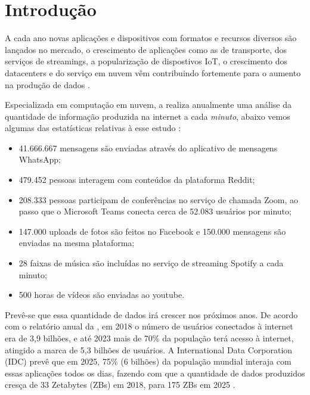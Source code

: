 \chapter{Introdução}
\label{chp:introduction}



A cada ano novas aplicações e dispositivos com formatos e recursos diversos são lançados no mercado, o crescimento de aplicações como as de transporte, dos serviços de streamings, a popularização de  dispostivos IoT, o crescimento dos datacenters e do serviço em nuvem vêm contribuindo fortemente para o aumento na produção de dados \citep{relatorio-idc}.

Especializada em computação em nuvem, a \citeauthor{domo-study} realiza anualmente uma análise da quantidade de informação produzida na internet 
a cada \textit{minuto}, abaixo vemos algumas das estatísticas relativas à esse estudo \citet{domo-study}:
\begin{itemize}
    \item 41.666.667 mensagens são enviadas através do aplicativo de mensagens WhatsApp;
    \item 479.452 pessoas interagem com conteúdos da plataforma Reddit;
    \item 208.333 pessoas participam de conferências no serviço de chamada Zoom, ao passo que o Microsoft Teams conecta cerca de 52.083 usuários por minuto;
    \item 147.000 uploads de fotos são feitos no Facebook e 150.000 mensagens são enviadas na mesma plataforma;
    \item 28 faixas de música são incluídas no serviço de streaming Spotify a cada minuto;
    \item 500 horas de vídeos são enviadas ao youtube.
\end{itemize}

Prevê-se que essa quantidade de dados irá crescer nos próximos anos. De acordo com o relatório anual da \citet{relatorio-cisco}, em 2018 o número de
usuários conectados à internet era de 3,9 bilhões, e até 2023 mais de 70\% da população terá acesso à internet, atingido a marca de 5,3 bilhões de usuários.
A International Data Corporation (IDC) prevê que em 2025, 75\% (6 bilhões) da população mundial interaja com essas aplicações todos os dias,
fazendo com que a quantidade de dados produzidos cresça de 33 Zetabytes (ZBs) em 2018, para 175 ZBs em 2025 \citep{relatorio-idc}.%


